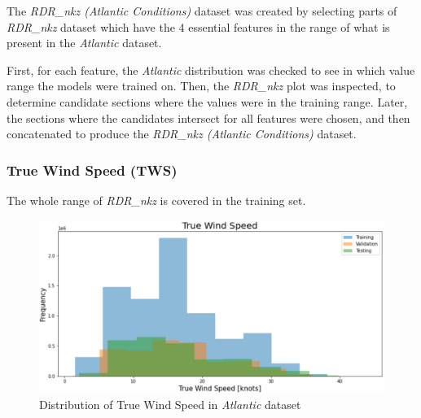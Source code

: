 The \textit{RDR\_nkz (Atlantic Conditions)} dataset was created by selecting parts of \textit{RDR\_nkz} dataset which have the 4 essential features in the range of what is present in the \textit{Atlantic} dataset.

First, for each feature, the \textit{Atlantic} distribution was checked to see in which value range the models were trained on. Then, the \textit{RDR\_nkz} plot was inspected, to determine candidate sections where the values were in the training range. Later, the sections where the candidates intersect for all features were chosen, and then concatenated to produce the \textit{RDR\_nkz (Atlantic Conditions)} dataset.

\clearpage
\subsubsection{True Wind Speed (TWS)}
The whole range of \textit{RDR\_nkz} is covered in the training set.

\begin{figure}[h]
\centering
\includegraphics[width = \hsize]{figures/distributions/atlantic-TWS.png}
\caption{Distribution of True Wind Speed in \textit{Atlantic} dataset \cite{charles}}
\end{figure}

